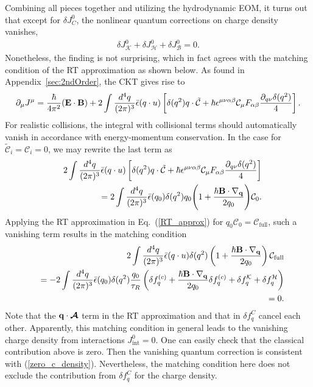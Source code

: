 \documentclass[aps,prd,showkeys,preprint,amsmath,amssymb,nofootinbib]{revtex4-1}
\begin{document}
Combining all pieces together and utilizing the hydrodynamic EOM, it turns out that except for $\delta J^0_C$, the nonlinear quantum corrections on charge density vanishes,
\begin{eqnarray}\label{zero_c_density}
\delta J_{\mathcal{K}}^0+\delta J_{\mathcal{H}}^0+\delta J_{\mathcal{B}}^0=0.
\end{eqnarray}
Nonetheless, the finding is not surprising, which in fact agrees with the matching condition of the RT approximation as shown below. As found in Appendix~\ref{sec:2ndOrder}, the CKT gives rise to 
\begin{eqnarray}\label{anomalous_eq}
  \partial_{\mu}J^{\mu}=\frac{\hbar}{4\pi^2}({\bf E\cdot B})+2\int\frac{d^4q}{(2\pi)^3}\bar{\epsilon}(q\cdot u)\left[\delta(q^2)q\cdot\tilde{\mathcal{C}}+\hbar\epsilon^{\mu\nu\alpha\beta}\mathcal{C}_{\mu}F_{\alpha\beta}\frac{\partial_{q\nu}\delta(q^2)}{4}\right].
\end{eqnarray}
For realistic collisions, the integral with collisional terms should automatically vanish in accordance with energy-momentum conservation. In the case for $\tilde{\mathcal{C}}_i=\mathcal{C}_{i}=0$, we may rewrite the last term as
\begin{eqnarray}\nonumber\label{matching_cond}
&&2\int\frac{d^4q}{(2\pi)^3}\bar{\epsilon}(q\cdot u)\left[\delta(q^2)q\cdot\tilde{\mathcal{C}}+\hbar\epsilon^{\mu\nu\alpha\beta}\mathcal{C}_{\mu}F_{\alpha\beta}\frac{\partial_{q\nu}\delta(q^2)}{4}\right]
\\
&&=2\int\frac{d^4q}{(2\pi)^3}\bar{\epsilon}(q_0)\delta(q^2)q_0\Bigg(1+\frac{\hbar {\bf B}\cdot\nabla_{\bf q}}{2q_0}\Bigg)\mathcal{C}_0.
\end{eqnarray}
Applying the RT approximation in Eq.~(\ref{RT_approx}) for $q_0\mathcal{C}_0=\mathcal{C}_\text{full}$, such a vanishing term results in the matching condition
\begin{eqnarray}\nonumber
&&2\int\frac{d^4q}{(2\pi)^3}\bar{\epsilon}(q\cdot u)\delta(q^2)\left(1+\frac{\hbar {\bf B}\cdot\nabla_{\bf q}}{2q_0}\right)\mathcal{C}_\text{full}
\\\nonumber
&&=-2\int\frac{d^4q}{(2\pi)^3}\bar{\epsilon}(q_0)\delta(q^2)\frac{q_0}{\tau_R}\left(\delta f_q^{(c)}+\frac{\hbar {\bf B}\cdot\nabla_{\bf q}}{2q_0}\delta f_q^{(c)}+\delta f^{\mathcal{K}}_q+\delta f^{\mathcal{H}}_q\right)
\\
&&=0.
\end{eqnarray}
Note that the ${\bf q}\cdot\bm{\mathcal{A}}$ term in the RT approximation and that in $\delta f^{C}_q$ cancel each other.
Apparently, this matching condition in general leads to the vanishing charge density from interactions $J^0_\text{int}=0$. One can easily check that the classical contribution above is zero. Then the vanishing quantum correction is consistent with (\ref{zero_c_density}). Nevertheless, the matching condition here does not exclude the contribution from $\delta f^{C}_q$ for the charge density. 
 
\end{document}
